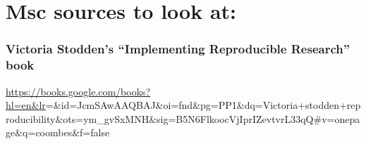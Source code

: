 \documentclass[12pt]{article}
\begin{document}
\section{Msc sources to look at:}\label{msc-sources-to-look-at}

\subsubsection{\texorpdfstring{Victoria Stodden's ``Implementing
Reproducible Research''
book}{Victoria Stodden's Implementing Reproducible Research book}}\label{victoria-stoddens-implementing-reproducible-research-book}

\url{https://books.google.com/books?hl=en\&lr}=\&id=JcmSAwAAQBAJ\&oi=fnd\&pg=PP1\&dq=Victoria+stodden+reproducibility\&ots=ym\_gvSxMNH\&sig=B5N6FlkoocVjIprIZevtvrL33qQ\#v=onepage\&q=coombes\&f=false



\end{document}
